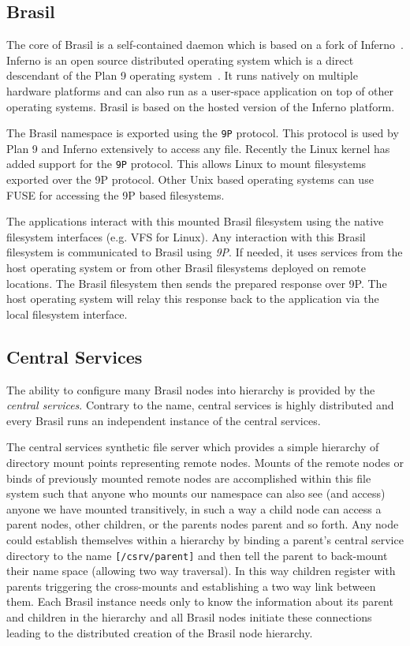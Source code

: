 \subsection{Brasil}

The core of Brasil is a self-contained daemon which is based on a fork of
Inferno~\cite{dorward1997ios}.
Inferno is an open source distributed operating system 
which is a direct descendant of the Plan 9 operating system~\cite{pike1995pbl}.  
It runs natively on
multiple hardware platforms and can also run as a user-space application on
top of other operating systems.
Brasil is based on the hosted version of the Inferno platform.

The Brasil namespace is exported using the \texttt{9P} protocol. 
This protocol is used by Plan 9 and Inferno extensively to access any file. 
Recently the Linux kernel has added support for the \texttt{9P}
protocol\cite{graverobbers}.  This allows Linux to mount filesystems
exported over the 9P protocol.  Other Unix based operating systems can use
FUSE for accessing the 9P based filesystems. 

The applications interact with this mounted Brasil filesystem using the native
filesystem interfaces (e.g. VFS for Linux). Any interaction with this Brasil
filesystem is communicated to Brasil using \textit{9P}. 
If needed, it uses services from the host operating system or from other Brasil
filesystems deployed on remote locations.  The Brasil filesystem then sends the
prepared response over 9P. The host operating system will relay this response
back to the application via the local filesystem interface.

\subsection{Central Services}

The ability to configure many Brasil nodes into hierarchy is provided by the
\textit{central services}.  Contrary to the name, central services is
highly distributed and every Brasil runs an independent instance of the central
services.  

The central services synthetic file server which provides a simple hierarchy of
directory mount points representing remote nodes.  Mounts of the remote nodes
or binds of previously mounted remote nodes are accomplished within this file
system such that anyone who mounts our namespace can also see (and
access) anyone we have mounted transitively,  in such a way a child
node can access a parent nodes, other children, or the parents nodes
parent and so forth. Any node could establish themselves within a
hierarchy by binding a parent's central service directory to the name
\texttt{[/csrv/parent]} and then tell the parent to back-mount their name space
(allowing two way traversal).  In this way children register with parents
triggering the cross-mounts and establishing a two way link between them. Each
Brasil instance needs only to know the information about its parent and children
in the hierarchy and all Brasil nodes initiate these connections leading to
the distributed creation of the Brasil node hierarchy.
 
